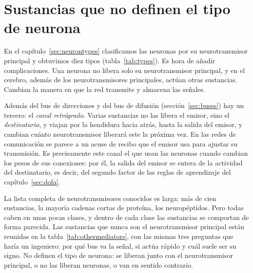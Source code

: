 \chapter{Sustancias que no definen el tipo de neurona}
\label{sec:othermediators}

En el capítulo~\ref{sec:neurontypes} clasificamos las neuronas por su neurotransmisor principal y obtuvimos diez tipos (tabla~\ref{tab:types}). Es hora de añadir complicaciones. Una neurona no libera solo su neurotransmisor principal, y en el cerebro, además de los neurotransmisores principales, actúan otras sustancias. Cambian la manera en que la red transmite y almacena las señales.

Además del bus de direcciones y del bus de difusión (sección~\ref{sec:buses}) hay un tercero: el \emph{canal retrógrado}. Varias sustancias no las libera el emisor, sino el \emph{destinatario}, y viajan por la hendidura hacia atrás, hasta la salida del emisor, y cambian cuánto neurotransmisor liberará este la próxima vez. En las redes de comunicación se parece a un acuse de recibo que el emisor usa para ajustar su transmisión. Es precisamente este canal el que usan las neuronas cuando cambian los pesos de sus conexiones: por él, la salida del emisor se entera de la actividad del destinatario, es decir, del segundo factor de las reglas de aprendizaje del capítulo~\ref{sec:dofa}.

La lista completa de neurotransmisores conocidos es larga: más de cien sustancias, la mayoría cadenas cortas de proteína, los neuropéptidos. Pero todas caben en unas pocas clases, y dentro de cada clase las sustancias se comportan de forma parecida. Las sustancias que nunca son el neurotransmisor principal están reunidas en la tabla~\ref{tab:othermediators}, con las mismas tres preguntas que haría un ingeniero: por qué bus va la señal, si actúa rápido y cuál suele ser su signo. No definen el tipo de neurona: se liberan junto con el neurotransmisor principal, o no las liberan neuronas, o van en sentido contrario.

